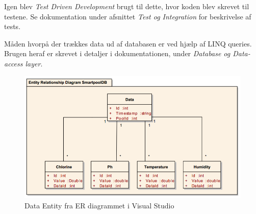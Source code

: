Igen blev \textit{Test Driven Development} brugt til dette, hvor koden blev skrevet til testene. Se dokumentation under afsnittet \textit{Test og Integration} for beskrivelse af tests.

Måden hvorpå der trækkes data ud af databasen er ved hjælp af LINQ queries. Brugen heraf er skrevet i detaljer i dokumentationen, under \textit{Database og Data-access layer}.

\begin{figure}[h]
	\centering
	\includegraphics[width=0.8\linewidth]{figs/implementering/datasetentity.png}
	\caption{Data Entity fra ER diagrammet i Visual Studio}
	\label{fig:datasetentity}
\end{figure}